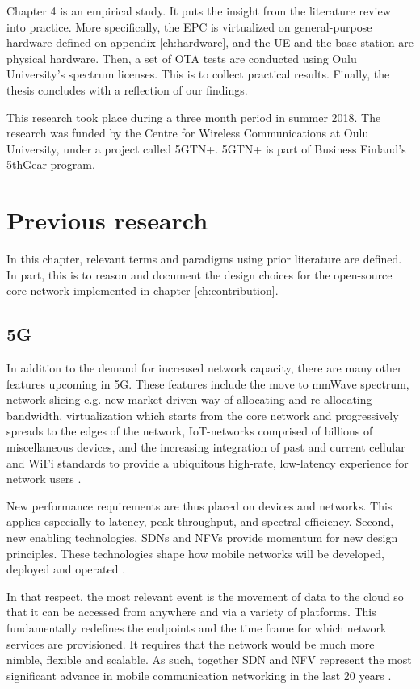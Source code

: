 \documentclass[12pt]{article}
\begin{document}
Chapter 4 is an empirical study. It puts the insight from the literature review into practice. More specifically, the \gls{EPC} is virtualized on general-purpose hardware defined on appendix \ref{ch:hardware}, and the \gls{UE} and the base station are physical hardware. Then, a set of \gls{OTA} tests are conducted using Oulu University's spectrum licenses. This is to collect practical results. Finally, the thesis concludes with a reflection of our findings.

This research took place during a three month period in summer 2018. The research was funded by the Centre for Wireless Communications at Oulu University, under a project called \gls{5GTN+}. \gls{5GTN+} is part of Business Finland’s 5thGear program.
\newpage

\section{Previous research}

In this chapter, relevant terms and paradigms using prior literature are defined. In part, this is to reason and document the design choices for the open-source core network implemented in chapter \ref{ch:contribution}.

\subsection{5G}

In addition to the demand for increased network capacity, there are many other features upcoming in \gls{5G}. These features include the move to \gls{mmWave} spectrum, network slicing e.g. new market-driven way of allocating and re-allocating bandwidth, virtualization which starts from the core network and progressively spreads to the edges of the network, \gls{IoT}-networks comprised of billions of miscellaneous devices, and the increasing integration of past and current cellular and WiFi standards to provide a ubiquitous high-rate, low-latency experience for network users \cite{andrews2014will}.

New performance requirements are thus placed on devices and networks. This applies especially to latency, peak throughput, and spectral efficiency. Second, new enabling technologies, \glspl{SDN} and \glspl{NFV} provide momentum for new design principles. These technologies shape how mobile networks will be developed, deployed and operated \cite{trivisonno2015towards}.

In that respect, the most relevant event is the movement of data to the cloud so that it can be accessed from anywhere and via a variety of platforms. This fundamentally redefines the endpoints and the time frame for which network services are provisioned. It requires that the network would be much more nimble, flexible and scalable. As such, together \gls{SDN} and \gls{NFV} represent the most significant advance in mobile communication networking in the last 20 years \cite{andrews2014will}.
\end{document}
